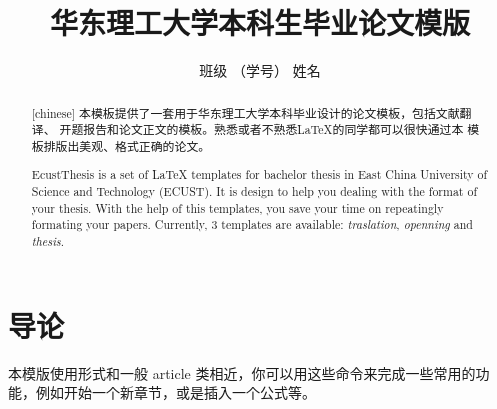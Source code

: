 \documentclass{ecustthesis}
\author{班级 （学号） 姓名}
\title{华东理工大学本科生毕业论文模版}
\begin{document}
\begin{abstract}[chinese]
  本模板提供了一套用于华东理工大学本科毕业设计的论文模板，包括文献翻译、
  开题报告和论文正文的模板。熟悉或者不熟悉\LaTeX 的同学都可以很快通过本
  模板排版出美观、格式正确的论文。
\end{abstract}

\begin{abstract}
  EcustThesis is a set of LaTeX templates for bachelor thesis in East
  China University of Science and Technology (ECUST). It is design to
  help you dealing with the format of your thesis. With the help of
  this templates, you save your time on repeatingly formating your
  papers. Currently, 3 templates are available:
  \emph{traslation}, \emph{openning} and \emph{thesis}.
\end{abstract}

\section{导论}

本模版使用形式和一般 article 类相近，你可以用这些命令来完成一些常用的功
能，例如开始一个新章节，或是插入一个公式等。
  
\end{document}
